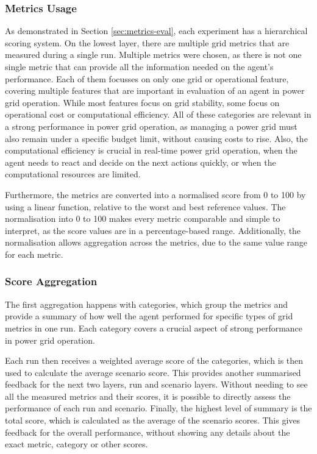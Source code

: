 \subsubsection{Metrics Usage}
As demonstrated in Section \ref{sec:metrics-eval}, each experiment has a hierarchical scoring system. On the lowest layer, there are multiple grid metrics that are measured during a single run. Multiple metrics were chosen, as there is not one single metric that can provide all the information needed on the agent's performance. Each of them focusses on only one grid or operational feature, covering multiple features that are important in evaluation of an agent in power grid operation. While most features focus on grid stability, some focus on operational cost or computational efficiency. All of these categories are relevant in a strong performance in power grid operation, as managing a power grid must also remain under a specific budget limit, without causing costs to rise. Also, the computational efficiency is crucial in real-time power grid operation, when the agent needs to react and decide on the next actions quickly, or when the computational resources are limited.

Furthermore, the metrics are converted into a normalised score from 0 to 100 by using a linear function, relative to the worst and best reference values. The normalisation into 0 to 100 makes every metric comparable and simple to interpret, as the score values are in a percentage-based range. Additionally, the normalisation allows aggregation across the metrics, due to the same value range for each metric. 

\subsubsection{Score Aggregation}
The first aggregation happens with categories, which group the metrics and provide a summary of how well the agent performed for specific types of grid metrics in one run. Each category covers a crucial aspect of strong performance in power grid operation.

Each run then receives a weighted average score of the categories, which is then used to calculate the average scenario score. This provides another summarised feedback for the next two layers, run and scenario layers. Without needing to see all the measured metrics and their scores, it is possible to directly assess the performance of each run and scenario. Finally, the highest level of summary is the total score, which is calculated as the average of the scenario scores. This gives feedback for the overall performance, without showing any details about the exact metric, category or other scores. 

